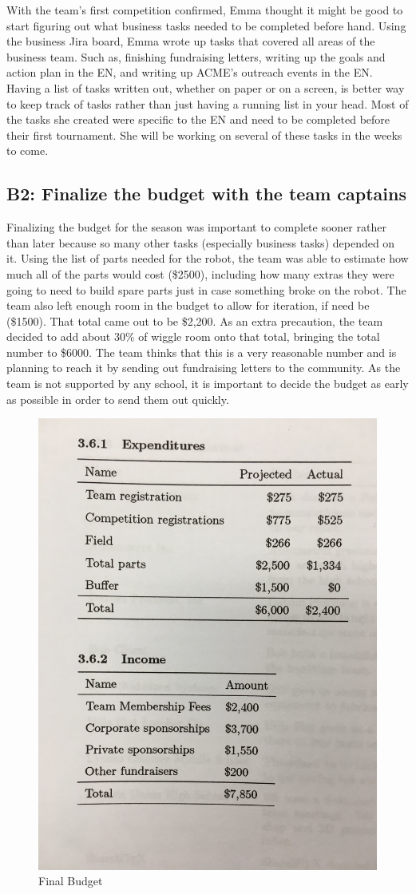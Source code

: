 \documentclass{article}
\begin{document}
With the team's first competition confirmed, Emma thought it might be good to start figuring out what business tasks needed to be completed before hand. Using the business Jira board, Emma wrote up tasks that covered all areas of the business team. Such as, finishing fundraising letters, writing up the goals and action plan in the EN, and writing up ACME's outreach events in the EN. Having a list of tasks written out, whether on paper or on a screen, is better way to keep track of tasks rather than just having a running list in your head. Most of the tasks she created were specific to the EN and need to be completed before their first tournament. She will be working on several of these tasks in the weeks to come.

\subsection{B2: Finalize the budget with the team captains}

Finalizing the budget for the season was important to complete sooner rather than later because so many other tasks (especially business tasks) depended on it. Using the list of parts needed for the robot, the team was able to estimate how much all of the parts would cost (\$2500), including how many extras they were going to need to build spare parts just in case something broke on the robot. The team also left enough room in the budget to allow for iteration, if need be (\$1500). That total came out to be \$2,200. As an extra precaution, the team decided to add about 30\% of wiggle room onto that total, bringing the total number to \$6000. The team thinks that this is a very reasonable number and is planning to reach it by sending out fundraising letters to the community. As the team is not supported by any school, it is important to decide the budget as early as possible in order to send them out quickly.

\begin{figure}
    \centering
    \includegraphics[width=.6 \textwidth]{07_10-15/images/budget.JPG}
    \caption{Final Budget}
    \label{fig: budget}
\end{figure}
\end{document}
